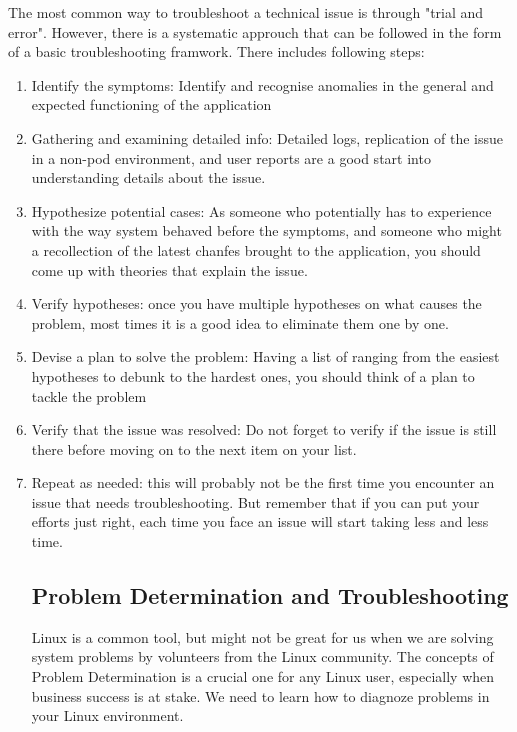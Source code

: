 \documentclass[11pt]{article}
\begin{document}
\noindent The most common way to troubleshoot a technical issue is through "trial and error". However, there is a systematic approuch that can be followed in the form of a basic troubleshooting framwork. There includes following steps:
\begin{enumerate}
    \item Identify the symptoms: Identify and recognise anomalies  in the general and expected functioning of the application
    \item Gathering and examining detailed info: Detailed logs, replication of the issue in a non-pod environment, and user reports are a good start into understanding details about the issue. 
    \item Hypothesize potential cases: As someone who potentially has to experience with the way system behaved before the symptoms, and someone who might a recollection of the latest chanfes brought to the application, you should come up with theories that explain the issue.
    \item Verify hypotheses: once you have multiple hypotheses on what causes the problem, most times it is a good idea to eliminate them one by one. 
    \item Devise a plan to solve the problem: Having a list of ranging from the easiest hypotheses to debunk to the hardest ones, you should think of a plan to tackle the problem
    \item Verify that the issue was resolved: Do not forget to verify if the issue is still there before moving on to the next item on your list. 
    \item Repeat as needed: this will probably not be the first time you encounter an issue that needs troubleshooting. But remember that if you can put your efforts just right, each time you face an issue will start taking less and less time. 

\subsection*{Problem Determination and Troubleshooting}
\noindent Linux is a common tool, but might not be great for us when we are solving system problems by volunteers from the Linux community. The concepts of Problem Determination is a crucial one for any Linux user, especially when business success is at stake. We need to learn how to diagnoze problems in your Linux environment.


\end{enumerate}
\end{document}
